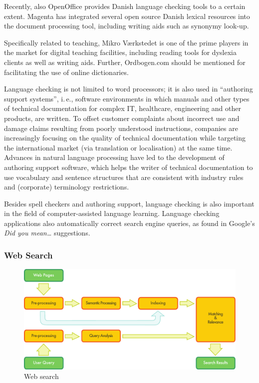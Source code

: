 \begin{multicols}{2}
Recently, also OpenOffice provides Danish language checking tools to a certain extent. Magenta  has integrated several open source Danish lexical resources into the document processing tool, including writing aids such as synonymy look-up. 

Specifically related to teaching, Mikro V\ae rk\-stedet is one of the prime players in the market for digital teaching facilities, including reading tools for dyslexia clients as well as writing aids. Further, Ordbogen.com should be mentioned for facilitating the use of online dictionaries.  

Language checking is not limited to word processors; it is also used in “authoring support systems”, i.\,e., software environments in which manuals and other types of technical documentation for complex IT, healthcare, engineering and other products, are written. To offset customer complaints about incorrect use and damage claims resulting from poorly understood instructions, companies are increasingly focusing on the quality of technical documentation while targeting the international market (via translation or localisation) at the same time. Advances in natural language processing have led to the development of authoring support software, which helps the writer of technical documentation to use vocabulary and sentence structures that are consistent with industry rules and (corporate) terminology restrictions.


Besides spell checkers and authoring support, language checking is also important in the field of computer-assisted language learning. Language checking applications also automatically correct search engine queries, as found in Google's \textit{Did you mean…} suggestions.

\subsubsection{Web Search}

\begin{figure}[htb]
  \center
  \includegraphics[width=\textwidth]{../_media/english/web_search_architecture}
  \caption{Web search}
\label{fig:websearcharch_en}
 \end{figure}


\end{multicols}
